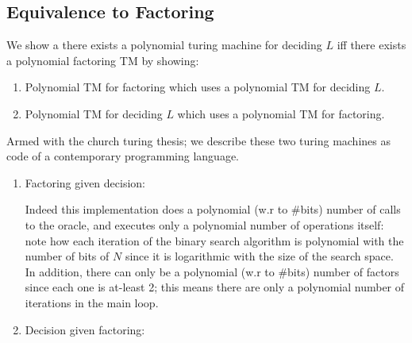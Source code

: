 \subsection{Equivalence to Factoring}
We show a there exists
a polynomial turing machine for deciding $L$ iff there exists a polynomial factoring
TM by showing:
\begin{enumerate}
	\item Polynomial TM for factoring which uses a polynomial TM for deciding $L$.
	\item Polynomial TM for deciding $L$ which uses a polynomial TM for factoring.
\end{enumerate}
Armed with the church turing thesis; we describe these two turing machines
as code of a contemporary programming language.

\begin{enumerate}
	\item Factoring given decision:
	
	Indeed this implementation does a polynomial (w.r to \#bits) number of calls to the oracle,
	and executes only a polynomial number of operations itself:\\
	note how each iteration of the binary search algorithm is polynomial with the number of
	bits of $N$ since it is logarithmic with the size of the search space.
	In addition, there can only be a polynomial (w.r to \#bits) number of factors
	since each one is at-least 2; this means there are only a polynomial number
	of iterations in the main loop.
	\item Decision given factoring:
	
\end{enumerate}

